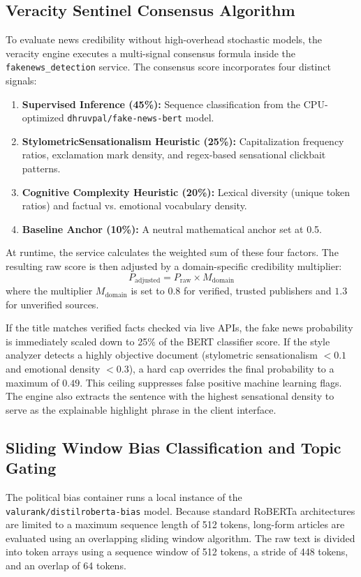 \subsection{Veracity Sentinel Consensus Algorithm}
To evaluate news credibility without high-overhead stochastic models, the veracity engine executes a multi-signal consensus formula inside the \texttt{fakenews\_detection} service. The consensus score incorporates four distinct signals:
\begin{enumerate}
    \item \textbf{Supervised Inference (45\%):} Sequence classification from the CPU-optimized \texttt{dhruvpal/fake-news-bert} model.
    \item \textbf{StylometricSensationalism Heuristic (25\%):} Capitalization frequency ratios, exclamation mark density, and regex-based sensational clickbait patterns.
    \item \textbf{Cognitive Complexity Heuristic (20\%):} Lexical diversity (unique token ratios) and factual vs. emotional vocabulary density.
    \item \textbf{Baseline Anchor (10\%):} A neutral mathematical anchor set at 0.5.
\end{enumerate}
At runtime, the service calculates the weighted sum of these four factors. The resulting raw score is then adjusted by a domain-specific credibility multiplier:
\begin{equation}
    P_{\text{adjusted}} = P_{\text{raw}} \times M_{\text{domain}}
\end{equation}
where the multiplier $M_{\text{domain}}$ is set to $0.8$ for verified, trusted publishers and $1.3$ for unverified sources. 

If the title matches verified facts checked via live APIs, the fake news probability is immediately scaled down to 25\% of the BERT classifier score. If the style analyzer detects a highly objective document (stylometric sensationalism $< 0.1$ and emotional density $< 0.3$), a hard cap overrides the final probability to a maximum of $0.49$. This ceiling suppresses false positive machine learning flags. The engine also extracts the sentence with the highest sensational density to serve as the explainable highlight phrase in the client interface.

\subsection{Sliding Window Bias Classification and Topic Gating}
The political bias container runs a local instance of the \texttt{valurank/distilroberta-bias} model. Because standard RoBERTa architectures are limited to a maximum sequence length of 512 tokens, long-form articles are evaluated using an overlapping sliding window algorithm. The raw text is divided into token arrays using a sequence window of 512 tokens, a stride of 448 tokens, and an overlap of 64 tokens.

